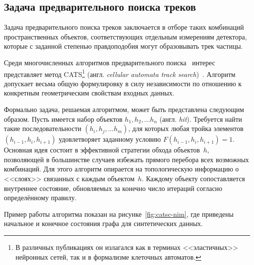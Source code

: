\subsection{Задача предварительного поиска треков}

Задача предварительного поиска треков %
заключается в отборе таких комбинаций пространственных объектов,
соответствующих отдельным измерениям детектора, которые с заданной
степенью правдоподобия могут образовывать трек частицы.


Среди многочисленных алгоритмов предварительного поиска~\cite{MankelTracking}
интерес представляет метод CATS\footnote{В различных публикациях
он излагался как в терминах <<эластичных>> нейронных сетей,
так и в формализме клеточных автоматов.}
(англ. \emph{cellular automata track search})~\cite{catsc-JINR, catsc-discrete, catsc-nim, catsc-disto}.
Алгоритм допускает весьма общую формулировку в силу независимости по
отношению к конкретным геометрическим свойствам входных данных.

Формально задача, решаемая алгоритмом, может быть представлена следующим образом.
Пусть имеется
набор объектов $h_1,h_2, ...h_n$ (англ. \emph{hit}). Требуется найти такие
последовательности $(h_i,h_j,...h_m)$, для которых любая тройка
элементов $(h_{i-1},h_{i},h_{i+1})$ удовлетворяет заданному
условию $F(h_{i-1},h_{i},h_{i+1})=1$.
Основная идея состоит в эффективной стратегии обхода
объектов~$h$, позволяющей в большинстве случаев избежать прямого перебора
всех возможных комбинаций. Для этого алгоритм опирается на
топологическую информацию о <<слоях>> связанных с каждым
объектом~$h$. Каждому объекту сопоставляется
внутреннее состояние, обновляемых за конечно число итераций согласно
определённому правилу.

Пример работы алгоритма показан на рисунке~\ref{fig:catsc-nim},
где приведены начальное и конечное состояния графа для
синтетических данных.

